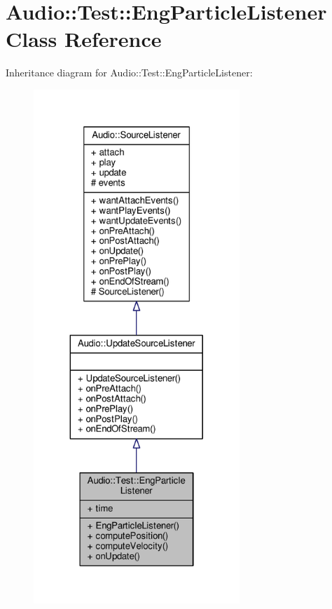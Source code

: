 \hypertarget{classAudio_1_1Test_1_1EngParticleListener}{}\section{Audio\+:\+:Test\+:\+:Eng\+Particle\+Listener Class Reference}
\label{classAudio_1_1Test_1_1EngParticleListener}


Inheritance diagram for Audio\+:\+:Test\+:\+:Eng\+Particle\+Listener\+:
\nopagebreak
\begin{figure}[H]
\begin{center}
\leavevmode
\includegraphics[height=550pt]{d5/de0/classAudio_1_1Test_1_1EngParticleListener__inherit__graph}
\end{center}
\end{figure}


